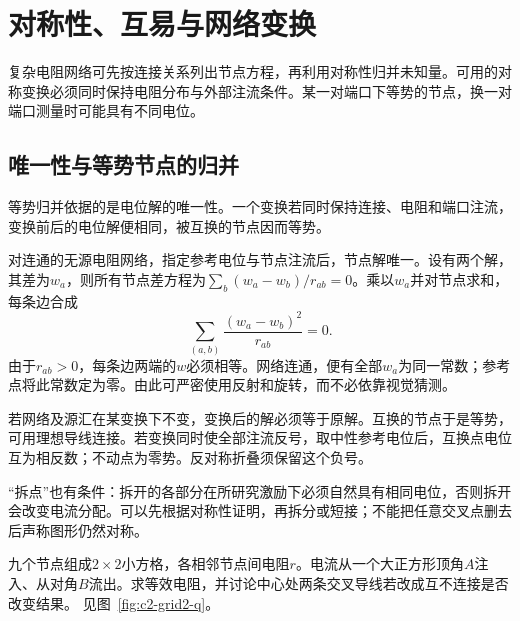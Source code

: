 \chapter{对称性、互易与网络变换}
复杂电阻网络可先按连接关系列出节点方程，再利用对称性归并未知量。可用的对称变换必须同时保持电阻分布与外部注流条件。某一对端口下等势的节点，换一对端口测量时可能具有不同电位。



\section{唯一性与等势节点的归并}\label{sec:c2-sym}
等势归并依据的是电位解的唯一性。一个变换若同时保持连接、电阻和端口注流，变换前后的电位解便相同，被互换的节点因而等势。

对连通的无源电阻网络，指定参考电位与节点注流后，节点解唯一。设有两个解，其差为$w_a$，则所有节点差方程为$\sum_b(w_a-w_b)/r_{ab}=0$。乘以$w_a$并对节点求和，每条边合成
\[
 \sum_{(a,b)}\frac{(w_a-w_b)^2}{r_{ab}}=0.
\]
由于$r_{ab}>0$，每条边两端的$w$必须相等。网络连通，便有全部$w_a$为同一常数；参考点将此常数定为零。由此可严密使用反射和旋转，而不必依靠视觉猜测。

若网络及源汇在某变换下不变，变换后的解必须等于原解。互换的节点于是等势，可用理想导线连接。若变换同时使全部注流反号，取中性参考电位后，互换点电位互为相反数；不动点为零势。反对称折叠须保留这个负号。

“拆点”也有条件：拆开的各部分在所研究激励下必须自然具有相同电位，否则拆开会改变电流分配。可以先根据对称性证明，再拆分或短接；不能把任意交叉点删去后声称图形仍然对称。

\begin{example}[二阶方格的对角端口]\label{ex:c2-grid2}
九个节点组成$2\times2$小方格，各相邻节点间电阻$r$。电流从一个大正方形顶角$A$注入、从对角$B$流出。求等效电阻，并讨论中心处两条交叉导线若改成互不连接是否改变结果。 见图~\ref{fig:c2-grid2-q}。
\end{example}


